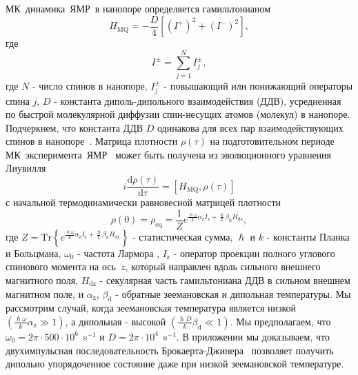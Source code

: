 \documentclass[utf8]{jetp}
\begin{document}
МК~динамика~ЯМР~в нанопоре определяется гамильтонианом~\cite{Doronin_2019,Doronin_2009}
%
\begin{equation}
  \label{eq:1}
  H_{\mathrm{MQ}} = - \dfrac{D}{4} \left[
    \left(I^{+}\right)^{2}
    + \left(I^{-}\right)^{2}
  \right] ,
\end{equation}
%
где
%
\begin{equation}
  \label{eq:2}
  I^{\pm} = \sum\limits_{j=1}^{N} I_{j}^{\pm},
\end{equation}
%
где $N$ - число спинов в нанопоре, $I^{\pm}_{j}$ - повышающий или понижающий операторы спина $j$, $D$ - константа диполь-дипольного взаимодействия (ДДВ),
усредненная по быстрой молекулярной диффузии спин-несущих атомов (молекул) в нанопоре.
Подчеркнем, что константа ДДВ $D$ одинакова для всех пар взаимодействующих спинов в нанопоре~\cite{Doronin_2019,Doronin_2009}.
Матрица плотности $\rho(\tau)$ на подготовительном периоде МК~эксперимента~ЯМР~\cite{Baum_1985} может быть получена из эволюционного уравнения Лиувилля~\cite{Goldman_1970,Abragam_1982}
%
\begin{equation}
  \label{eq:3}
  i\dfrac{\mathrm{d}\rho(\tau)}{\mathrm{d}\tau} = \left[
  H_\mathrm{MQ},\rho(\tau)
  \right]
\end{equation}
%
с начальной термодинамически равновесной матрицей плотности
%
\begin{equation}
  \label{eq:4}
    \rho(0) = \rho_\mathrm{eq} = \dfrac{1}{Z}
    e^{
      \frac{\hslash \omega}{k} \alpha_\mathrm{z} I_\mathrm{z}
      + \frac{\hslash }{k} \beta_\mathrm{d} H_\mathrm{dz}
    },
\end{equation}
%
где
$Z = \mathrm{Tr} \left\{ e^{\frac{\hslash \omega}{k} \alpha_\mathrm{z} I_\mathrm{z} + \frac{\hslash }{k} \beta_\mathrm{d} H_\mathrm{dz}} \right\}$ - статистическая сумма,
$\hslash$ и $k$ - константы Планка и Больцмана,
$\omega_{0}$ - частота Лармора ,
$I_\mathrm{z}$ -  оператор проекции полного углового спинового момента  на ось~$z$,
который направлен вдоль сильного внешнего магнитного поля,
$H_\mathrm{dz}$ - секулярная часть гамильтониана ДДВ в сильном внешнем магнитном поле,
и $\alpha_\mathrm{z}$, $\beta_\mathrm{d}$ - обратные зеемановская и дипольная температуры.
Мы рассмотрим случай, когда зеемановская температура  является низкой $({\frac{\hslash \omega}{k} \alpha_\mathrm{z}}\gg 1)$,
а дипольная - высокой $\left( \frac{\hslash{D}}{k}\beta_\mathrm{d} \ll 1\right)$.
Мы предполагаем, что $\omega_{0} = 2\pi \cdot 500 \cdot 10^{6}$~s$^{-1}$ и $D = 2\pi \cdot 10^{4}$~s$^{-1}$.
В приложении мы доказываем, что двухимпульсная последовательность Брокаерта-Джинера~\cite{Goldman_1970,Jeener_1967} позволяет получить дипольно упорядоченное состояние даже при низкой зеемановской температуре.
\end{document}
